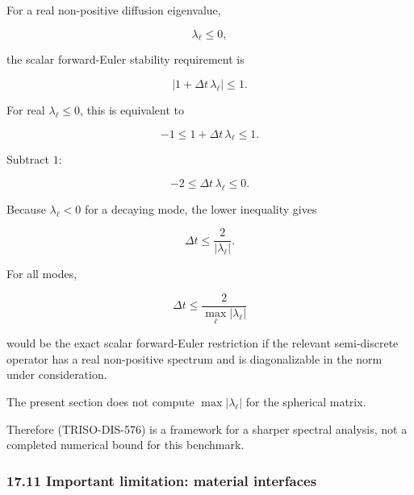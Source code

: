 \documentclass[11pt,a4paper]{article}
\begin{document}
For a real non-positive diffusion eigenvalue,

\begin{equation}
\lambda_\ell\le0,
\tag{TRISO-DIS-571}
\label{eq:triso-dis-571}
\end{equation}

the scalar forward-Euler stability requirement is

\begin{equation}
|1+\Delta t\,\lambda_\ell|\le1.
\tag{TRISO-DIS-572}
\label{eq:triso-dis-572}
\end{equation}

For real $\lambda_\ell\le0$, this is equivalent to

\begin{equation}
-1
\le
1+\Delta t\,\lambda_\ell
\le
1.
\tag{TRISO-DIS-573}
\label{eq:triso-dis-573}
\end{equation}

Subtract $1$:

\begin{equation}
-2
\le
\Delta t\,\lambda_\ell
\le
0.
\tag{TRISO-DIS-574}
\label{eq:triso-dis-574}
\end{equation}

Because $\lambda_\ell<0$ for a decaying mode, the lower inequality gives

\begin{equation}
\Delta t
\le
\frac{2}{|\lambda_\ell|}.
\tag{TRISO-DIS-575}
\label{eq:triso-dis-575}
\end{equation}

For all modes,

\begin{equation}
\boxed{
\Delta t
\le
\frac{2}{
\max_\ell|\lambda_\ell|
}
}
\tag{TRISO-DIS-576}
\label{eq:triso-dis-576}
\end{equation}

would be the exact scalar forward-Euler restriction if the relevant semi-discrete operator has a real non-positive spectrum and is diagonalizable in the norm under consideration.

The present section does not compute $\max|\lambda_\ell|$ for the spherical matrix.

Therefore (TRISO-DIS-576) is a framework for a sharper spectral analysis, not a completed numerical bound for this benchmark.

\subsubsection*{17.11 Important limitation: material interfaces}
\end{document}
